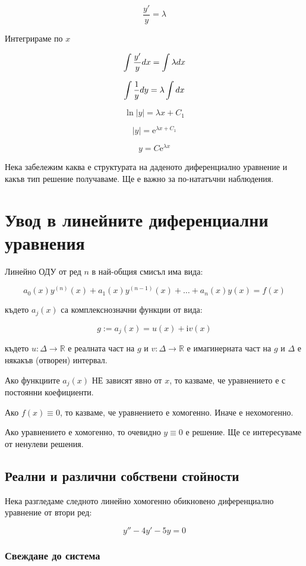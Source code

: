 \documentclass{scrartcl}
\begin{document}
$$\dfrac{y'}{y} = \lambda$$

Интегрираме по $x$

$$\int \dfrac{y'}{y} \space dx = \int \lambda \space dx$$

$$\int \dfrac{1}{y} \space dy = \lambda \int dx$$

$$\ln{|y|} = \lambda x + C_1$$

$$|y| = \mathrm{e}^{\lambda x + C_1}$$

$$y = C \mathrm{e}^{\lambda x}$$

Нека забележим каква е структурата на даденото диференциално уравнение и какъв тип решение получаваме. Ще е важно за по-нататъчни наблюдения.

\section{Увод в линейните диференциални уравнения}

Линейно ОДУ от ред $n$ в най-общия смисъл има вида:

$$a_0(x)y^{(n)}(x) + a_1(x)y^{(n-1)}(x) + \dots + a_n(x)y(x) = f(x)$$

където $a_j(x)$ са комплекснозначни функции от вида:

$$g := a_j(x) = u(x) + \mathrm{i}v(x)$$

където $u: \Delta \rightarrow \mathbb{R}$ е реалната част на $g$ и $v: \Delta \rightarrow \mathbb{R}$ е имагинерната част на $g$ и $\Delta$ е някакъв (отворен) интервал.

Ако функциите $a_j(x)$ НЕ зависят явно от $x$, то казваме, че уравнението е с постоянни коефициенти.

Ако $f(x) \equiv 0$, то казваме, че уравнението е хомогенно. Иначе е нехомогенно.

Ако уравнението е хомогенно, то очевидно $y \equiv 0$ е решение. Ще се интересуваме от ненулеви решения.

\subsection{Реални и различни собствени стойности}

Нека разгледаме следното линейно хомогенно обикновено диференциално уравнение от втори ред:

$$y'' - 4y' - 5y = 0$$

\subsubsection{Свеждане до система}
\end{document}
